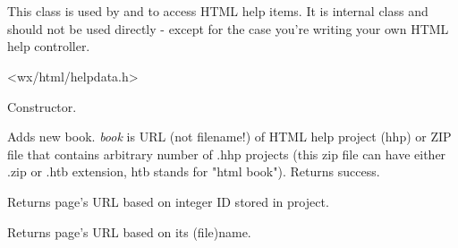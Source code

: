 %
%

\section{}\label{wxhtmlhelpdata}

This class is used by  
and  to access HTML help items.
It is internal class and should not be used directly - except for the case 
you're writing your own HTML help controller.




<wx/html/helpdata.h>




\label{wxhtmlhelpdatawxhtmlhelpdata}


Constructor.

\label{wxhtmlhelpdataaddbook}


Adds new book. {\it book} is URL (not filename!) of HTML help project (hhp)
or ZIP file that contains arbitrary number of .hhp projects (this zip
file can have either .zip or .htb extension, htb stands for "html book").
Returns success.

\label{wxhtmlhelpdatafindpagebyid}


Returns page's URL based on integer ID stored in project.

\label{wxhtmlhelpdatafindpagebyname}


Returns page's URL based on its (file)name.

\label{wxhtmlhelpdatagetbookrecarray}


